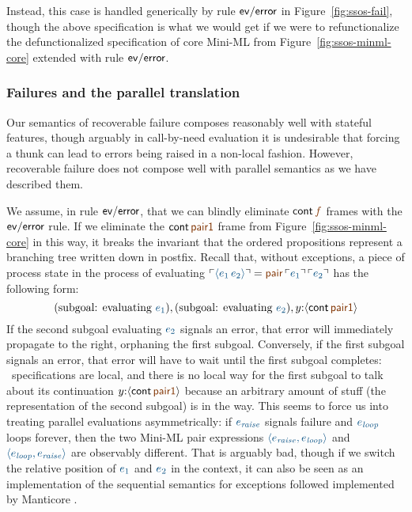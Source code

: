 
\noindent
Instead, this case is handled generically by rule ${\sf ev/error}$ in
Figure~\ref{fig:ssos-fail}, though the above specification is what we
would get if we were to refunctionalize the defunctionalized
specification of core Mini-ML from Figure~\ref{fig:ssos-minml-core}
extended with rule ${\sf ev/error}$.

\subsubsection{Failures and the parallel translation}

Our semantics of recoverable failure composes reasonably well with
stateful features, though arguably in call-by-need
evaluation it is undesirable that forcing a thunk can lead to errors
being raised in a non-local fashion. However,
recoverable failure does not compose well with parallel semantics as
we have described them. 

We assume, in rule ${\sf ev/error}$, that we can blindly eliminate
${\sf cont}\,\lf{f}$ frames with the ${\sf ev/error}$ rule.  If we
eliminate the ${\sf cont}\,\lf{\sf pair1}$ frame from
Figure~\ref{fig:ssos-minml-core} in this way, it breaks the invariant
that the ordered propositions represent a branching tree written down
in postfix. Recall that, without exceptions, a piece of process state
in the process of evaluating $\interp{\langle {e_1}\,{e_2}\rangle}
= \lf{{\sf pair}\,\interp{e_1}\,\interp{e_2}}$ has the
following form:
\[
\mbox{(subgoal: evaluating $\obj{e_1}$)},
\mbox{(subgoal: evaluating $\obj{e_2}$)},
y{:}\susp{{\sf cont}\,\lf{\sf pair1}} 
\]
If the second subgoal evaluating $\obj{e_2}$ signals an error, that error will
immediately propagate to the right, orphaning the first subgoal.
Conversely, if the first subgoal signals an error, that error will
have to wait until the first subgoal completes: \sls~specifications
are local, and there is no local way for the first subgoal to talk
about its continuation $y{:}\susp{{\sf cont}\,\lf{\sf pair1}}$ because an
arbitrary amount of stuff (the representation of the second subgoal)
is in the way. This seems to force us into treating parallel
evaluations asymmetrically: if $\obj{e_{\it raise}}$ signals failure and
$\obj{e_{\it loop}}$ loops forever, then the two Mini-ML pair expressions
$\obj{\langle e_{\it raise}, e_{\it loop} \rangle}$ and 
$\obj{\langle e_{\it
  loop}, e_{\it raise} \rangle}$ are observably different. That is arguably
bad, though if we switch the relative position of $\obj{e_1}$ and 
$\obj{e_2}$
in the context, it can also be seen as an implementation of the
sequential semantics for exceptions followed implemented by Manticore
\cite{fluet08scheduling}.

